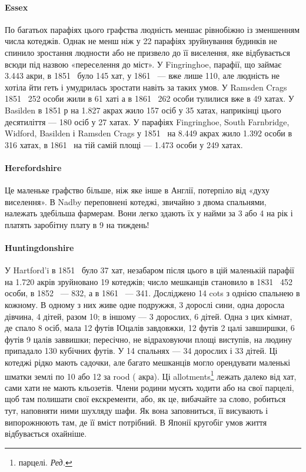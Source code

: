 \paragraph{Essex}

По багатьох парафіях цього графства людність меншає рівнобіжно
із зменшенням числа котеджів. Однак не менш ніж у
22 парафіях зруйнування будинків не спинило зростання людности
або не призвело до її виселення, яке відбувається всюди під
назвою «переселення до міст». У Fingringhoe, парафії, що займає
\num{3.443} акри, в 1851~ було 145 хат, у 1861~ — вже лише 110, але
людність не хотіла йти геть і умудрилась зростати навіть за
таких умов. У Ramsden Crags 1851~ 252 особи жили в 61 хаті
а в 1861~ 262 особи тулилися вже в 49 хатах. У Basilden в 1851 р
на \num{1.827} акрах жило 157 осіб у 35 хатах, наприкінці цього десятиліття
— 180 осіб у 27 хатах. У парафіях Fingringhoe, South
Farnbridge, Widford, Basilden і Ramsden Crags у 1851~ на
\num{8.449} акрах жило \num{1.392} особи в 316 хатах, в 1861~ на тій самій
площі — \num{1.473} особи у 249 хатах.

\paragraph{Herefordshire}

Це маленьке графство більше, ніж яке інше в Англії, потерпіло
від «духу виселення». В Nadby переповнені котеджі,
звичайно з двома спальнями, належать здебільша фармерам.
Вони легко здають їх у найми за 3 або 4 на рік
і платять заробітну плату в 9 на тиждень!

\paragraph{Huntingdonshire}

У Hartford’i в 1851~ було 37 хат, незабаром після цього
в цій маленькій парафії на \num{1.720} акрів зруйновано 19 котеджів;
число мешканців становило в 1831~ 452 особи, в 1852~ — 832,
а в 1861~ — 341. Досліджено 14 cots з однією спальнею в кожному.
В одному з них живе одне подружжя, 3 дорослі сини, одна
доросла дівчина, 4 дітей, разом 10; в іншому — 3 дорослих,
6 дітей. Одна з цих кімнат, де спало 8 осіб, мала 12 футів ІОцалів
завдовжки, 12 футів 2 цалі завширшки, 6 футів 9 цалів заввишки;
пересічно, не відраховуючи площі виступів, на людину припадало
130 кубічних футів. У 14 спальнях — 34 дорослих і 33 дітей. Ці
котеджі рідко мають садочки, але багато мешканців могло орендувати
маленькі шматки землі по 10 або 12 за rood ( акра).
Ці allotments\footnote*{
парцелі. \emph{Ред.}
} лежать далеко від хат, сами хати не мають кльозетів.
Члени родини мусять ходити або на свої парцелі, щоб там
полишати свої екскременти, або, як це, вибачайте за слово, робиться
тут, наповняти ними шухляду шафи. Як вона заповниться,
її висувають і випорожнюють там, де її вміст потрібний. В Японії
кругобіг умов життя відбувається охайніше.

